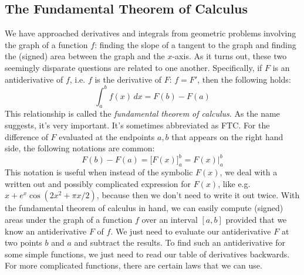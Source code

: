 \subsection{The Fundamental Theorem of Calculus}
We have approached derivatives and integrals from geometric problems involving the graph of a function $f$: finding the slope of a tangent to the graph and finding the (signed) area between the graph and the $x$-axis. As it turns out, these two seemingly disparate questions are related to one another. Specifically, if $F$ is an antiderivative of $f$, i.e. $f$ is the derivative of $F$: $f = F'$, then the following holds:
\begin{equation}
 \int_a^b f(x) \, dx = F(b) - F(a)
\end{equation}
This relationship is called the \emph{fundamental theorem of calculus}. As the name suggests, it's very important. It's sometimes abbreviated as FTC. For the difference of $F$ evaluated at the endpoints $a,b$ that appears on the right hand side, the following notations are common:
\begin{equation}
 F(b) - F(a) = \Big[ F(x) \Big]_a^b = F(x) \bigg\rvert_a^b
\end{equation}
This notation is useful when instead of the symbolic $F(x)$, we deal with a written out and possibly complicated expression for $F(x)$, like e.g. $x + e^x \cos(2 x^2 + \pi x /2 )$, because then we don't need to write it out twice. With the fundamental theorem of calculus in hand, we can easily compute (signed) areas under the graph of a function $f$ over an interval $[a,b]$ provided that we know an antiderivative $F$ of $f$. We just need to evaluate our antiderivative $F$ at two points $b$ and $a$ and subtract the results. To find such an antiderivative for some simple functions, we just need to read our table of derivatives backwards. For more complicated functions, there are certain laws that we can use. %




